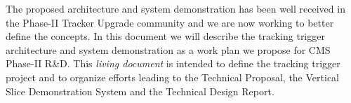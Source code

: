 \noindent The proposed architecture and system demonstration has been well received in the Phase-II Tracker Upgrade community and we are now working to better define the concepts.  In this document we will describe the tracking trigger architecture and system demonstration as a work plan we propose for CMS Phase-II R\&D.  This {\itshape living document} is intended to define the tracking trigger project and to organize efforts leading to the Technical Proposal, the Vertical Slice Demonstration System and the Technical Design Report.



\clearpage
